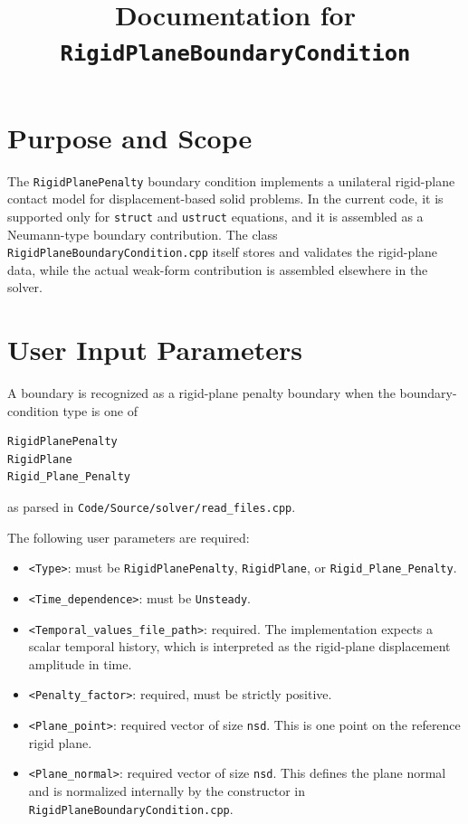 \documentclass[11pt]{article}
\title{Documentation for \texttt{RigidPlaneBoundaryCondition}}
\date{}
\begin{document}
\maketitle

\section{Purpose and Scope}

The \texttt{RigidPlanePenalty} boundary condition implements a unilateral rigid-plane
contact model for displacement-based solid problems. In the current code, it is
supported only for \texttt{struct} and \texttt{ustruct} equations, and it is
assembled as a Neumann-type boundary contribution. The class
\texttt{RigidPlaneBoundaryCondition.cpp} itself stores and validates the rigid-plane
data, while the actual weak-form contribution is assembled elsewhere in the solver.

\section{User Input Parameters}

A boundary is recognized as a rigid-plane penalty boundary when the
boundary-condition type is one of
\begin{verbatim}
RigidPlanePenalty
RigidPlane
Rigid_Plane_Penalty
\end{verbatim}
as parsed in \texttt{Code/Source/solver/read\_files.cpp}.

The following user parameters are required:

\begin{itemize}[leftmargin=*]
\item \texttt{<Type>}:
must be \texttt{RigidPlanePenalty}, \texttt{RigidPlane}, or
\texttt{Rigid\_Plane\_Penalty}.

\item \texttt{<Time\_dependence>}:
must be \texttt{Unsteady}.

\item \texttt{<Temporal\_values\_file\_path>}:
required. The implementation expects a scalar temporal history, which is
interpreted as the rigid-plane displacement amplitude in time.

\item \texttt{<Penalty\_factor>}:
required, must be strictly positive.

\item \texttt{<Plane\_point>}:
required vector of size \texttt{nsd}. This is one point on the reference rigid
plane.

\item \texttt{<Plane\_normal>}:
required vector of size \texttt{nsd}. This defines the plane normal and is
normalized internally by the constructor in
\texttt{RigidPlaneBoundaryCondition.cpp}.
\end{itemize}
\end{document}
